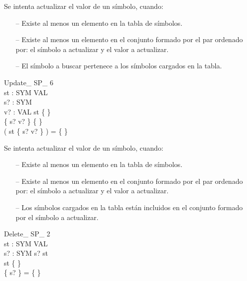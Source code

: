 \begin{tcolorbox}[colback=gray!5!white,colframe=gray!50!black,
  colbacktitle=gray!75!black,title=Update\_ SP\_ 5]
  Se intenta actualizar el valor de un símbolo, cuando:
     \begin{itemize}
        \item[--]{Existe al menos un elemento en la tabla de símbolos.}
        \item[--]{Existe al menos un elemento en el conjunto formado por el par ordenado por: el símbolo a actualizar y el valor a actualizar.}
        \item[--]{El símbolo a buscar pertenece a los símbolos cargados en la tabla.}
     \end{itemize}
\end{tcolorbox}


\begin{schema}{Update\_ SP\_ 6}\\
 st : SYM \pfun VAL \\
 s? : SYM \\
 v? : VAL 
\where
 st \neq \{ \} \\
 \{ s? \mapsto v? \} \neq \{ \} \\
 ( \dom st \cap \dom \{ s? \mapsto v? \} ) = \{ \}
\end{schema}

\begin{tcolorbox}[colback=gray!5!white,colframe=gray!50!black,
  colbacktitle=gray!75!black,title=Update\_ SP\_ 6]
  Se intenta actualizar el valor de un símbolo, cuando:
     \begin{itemize}
        \item[--]{Existe al menos un elemento en la tabla de símbolos.}
        \item[--]{Existe al menos un elemento en el conjunto formado por el par ordenado por: el símbolo a actualizar y el valor a actualizar.}
        \item[--]{Los símbolos cargados en la tabla están incluidos en el conjunto formado por el símbolo a actualizar.}
     \end{itemize}
\end{tcolorbox}


\begin{schema}{Delete\_ SP\_ 2}\\
 st : SYM \pfun VAL \\
 s? : SYM 
\where
 s? \in \dom st \\
 st \neq \{ \} \\
 \{ s? \} = \{ \}
\end{schema}

